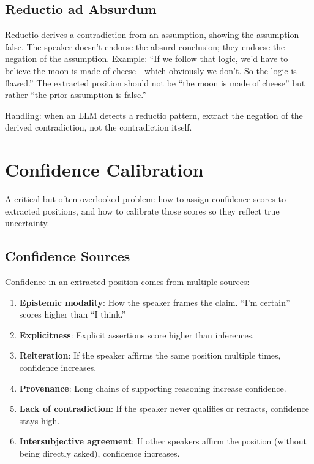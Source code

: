 \documentclass[11pt,letterpaper]{article}
\begin{document}
\subsection{Reductio ad Absurdum}

Reductio derives a contradiction from an assumption, showing the assumption false. The speaker doesn't endorse the absurd conclusion; they endorse the negation of the assumption. Example: ``If we follow that logic, we'd have to believe the moon is made of cheese—which obviously we don't. So the logic is flawed.'' The extracted position should not be ``the moon is made of cheese'' but rather ``the prior assumption is false.''

Handling: when an LLM detects a reductio pattern, extract the negation of the derived contradiction, not the contradiction itself.

\section{Confidence Calibration}

A critical but often-overlooked problem: how to assign confidence scores to extracted positions, and how to calibrate those scores so they reflect true uncertainty.

\subsection{Confidence Sources}

Confidence in an extracted position comes from multiple sources:

\begin{enumerate}
  \item \textbf{Epistemic modality}: How the speaker frames the claim. ``I'm certain'' scores higher than ``I think.''
  \item \textbf{Explicitness}: Explicit assertions score higher than inferences.
  \item \textbf{Reiteration}: If the speaker affirms the same position multiple times, confidence increases.
  \item \textbf{Provenance}: Long chains of supporting reasoning increase confidence.
  \item \textbf{Lack of contradiction}: If the speaker never qualifies or retracts, confidence stays high.
  \item \textbf{Intersubjective agreement}: If other speakers affirm the position (without being directly asked), confidence increases.
\end{enumerate}
\end{document}
